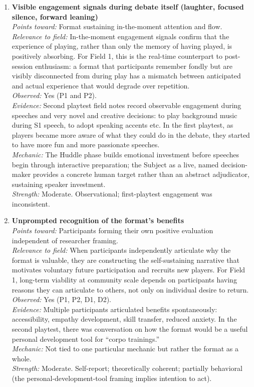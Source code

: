 \documentclass[12pt]{article}
\begin{document}
\begin{enumerate}
\item \textbf{Visible engagement signals during debate itself (laughter, focused silence, forward leaning)}\\
\textit{Points toward:} Format sustaining in-the-moment attention and flow.\\
\textit{Relevance to field:} In-the-moment engagement signals confirm that the experience of playing, rather than only the memory of having played, is positively absorbing. For Field 1, this is the real-time counterpart to post-session enthusiasm: a format that participants remember fondly but are visibly disconnected from during play has a mismatch between anticipated and actual experience that would degrade over repetition.\\
\textit{Observed:} Yes (P1 and P2).\\
\textit{Evidence:} Second playtest field notes record observable engagement during speeches and very novel and creative decisions: to play background music during S1 speech, to adopt speaking accents etc. In the first playtest, as players became more aware of what they could do in the debate, they started to have more fun and more passionate speeches.\\
\textit{Mechanic:} The Huddle phase builds emotional investment before speeches begin through interactive preparation; the Subject as a live, named decision-maker provides a concrete human target rather than an abstract adjudicator, sustaining speaker investment.\\
\textit{Strength:} Moderate. Observational; first-playtest engagement was inconsistent.

\item \textbf{Unprompted recognition of the format's benefits}\\
\textit{Points toward:} Participants forming their own positive evaluation independent of researcher framing.\\
\textit{Relevance to field:} When participants independently articulate why the format is valuable, they are constructing the self-sustaining narrative that motivates voluntary future participation and recruits new players. For Field 1, long-term viability at community scale depends on participants having reasons they can articulate to others, not only on individual desire to return.\\
\textit{Observed:} Yes (P1, P2, D1, D2).\\
\textit{Evidence:} Multiple participants articulated benefits spontaneously: accessibility, empathy development, skill transfer, reduced anxiety. In the second playtest, there was conversation on how the format would be a useful personal development tool for ``corpo trainings.''\\
\textit{Mechanic:} Not tied to one particular mechanic but rather the format as a whole.\\
\textit{Strength:} Moderate. Self-report; theoretically coherent; partially behavioral (the personal-development-tool framing implies intention to act).


\end{enumerate}
\end{document}
